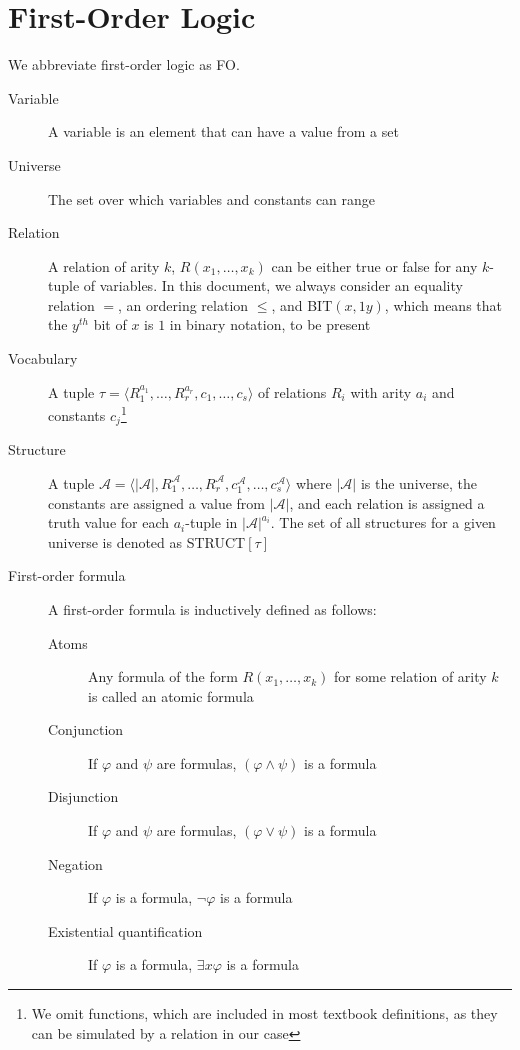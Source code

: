 \section{First-Order Logic}\label{sec:first-order-logic}
We abbreviate first-order logic as FO\@. %
\begin{description}
    \item[Variable] A variable is an element that can have a value from a set
    \item[Universe] The set over which variables and constants can range
    \item[Relation] A relation of arity $k$, $R(x_1, \dots, x_k)$ can be either true or false for any $k$-tuple of variables.
    In this document, we always consider an equality relation $=$, an ordering relation $\leq$, and BIT$(x, 1y)$, which means that the $y^{th}$ bit of $x$ is $1$ in binary notation, to be present
    \item[Vocabulary] A tuple $\tau = \langle R_1^{a_1}, \dots, R_r^{a_r}, c_1, \dots, c_s \rangle$ of relations $R_i$ with arity $a_i$ and constants $c_j$\footnote{We omit functions, which are included in most textbook definitions, as they can be simulated by a relation in our case}
    \item[Structure] A tuple $\mathcal{A} = \langle |\mathcal{A}|, R_1^{\mathcal{A}}, \dots, R_r^{\mathcal{A}}, c_1^{\mathcal{A}}, \dots, c_s^{\mathcal{A}} \rangle$ where $|\mathcal{A}|$ is the universe, the constants are assigned a value from $|\mathcal{A}|$, and each relation is assigned a truth value for each $a_i$-tuple in $|\mathcal{A}|^{a_i}$.
    The set of all structures for a given universe is denoted as STRUCT$[\tau]$
    \item[First-order formula] A first-order formula is inductively defined as follows:
    \begin{description}
        \item[Atoms] Any formula of the form $R(x_1, \dots, x_k)$ for some relation of arity $k$ is called an atomic formula
        \item[Conjunction] If $\varphi$ and $\psi$ are formulas, $(\varphi \land \psi)$ is a formula
        \item[Disjunction] If $\varphi$ and $\psi$ are formulas, $(\varphi \lor \psi)$ is a formula
        \item[Negation] If $\varphi$ is a formula, $\lnot \varphi$ is a formula
        \item[Existential quantification] If $\varphi$ is a formula, $\exists x \varphi$ is a formula

\end{description}
\end{description}
